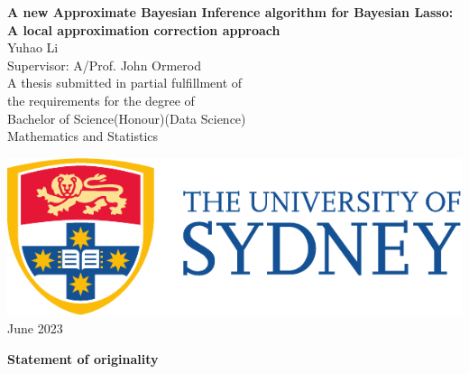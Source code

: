 \begin{titlepage}
\centering
{}
\vspace*{\fill}
\huge{\textbf{{\bf\Huge A new Approximate Bayesian Inference algorithm for Bayesian Lasso: A local approximation correction approach}}}\\



\vspace{2.5cm}
\LARGE{Yuhao Li}\\
\vspace{1cm}
\large{Supervisor: A/Prof. John Ormerod}\\
\large{A thesis submitted in partial fulfillment of \\ the requirements for the degree of \\  Bachelor of Science(Honour)(Data Science)} \\
\vspace{1cm}
\large{Mathematics and Statistics}\\
\vspace{1.5cm}
\date{September 2021}
    \includegraphics[scale=0.75]{UsydLogo.pdf}\\
\vspace{1.5cm}
\large{June 2023}\\
\vspace*{\fill}

\thispagestyle{empty}
\end{titlepage}



\pagebreak
\hspace{0pt}
\begin{center}
    \textbf{\large Statement of originality}\\
    \vspace{0.5cm}
\end{center}


